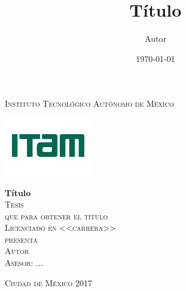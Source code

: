 \documentclass[letterpaper,onside,11pt]{book}
\title{T\'itulo}
\author{Autor}
\date{\today}
\begin{document}
 

\begin{titlepage}
	\begin{center}
		
		\textsc{\Large Instituto Tecnol\'ogico Aut\'onomo de M\'exico}\\[4em]
		
		\begin{center}
			\includegraphics{DocumentosLaTex/ITAM_2016.png}
		\end{center}
		
		\vspace{2em}
		
		{\sc \huge {\bf T\'itulo}}\\[4em]
		
		\textsc{\large Tesis}\\[1em]
		
		\textsc{que para obtener el t\'itulo}\\[1em]
		
		\textsc{Licenciado en <<carrera>>}\\[1em]
		
		\textsc{presenta}\\[1em]
		
		\textsc{\Large Autor}\\[1em]
		
		\textsc{\large Asesor: ...}
		
	\end{center}
	
	\vspace*{\fill}
	\textsc{Ciudad de M\'exico \hspace*{\fill} 2017}
	
\end{titlepage}

%	
\tableofcontents




\medskip
{}



\appendix
%
\end{document}
